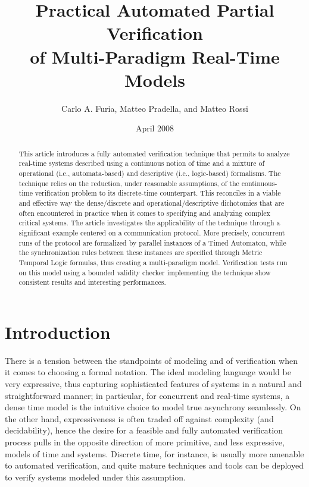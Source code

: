 \documentclass[a4paper]{article}
\title{Practical Automated Partial Verification \\ of Multi-Paradigm Real-Time Models}
\author{Carlo A. Furia, Matteo Pradella, and Matteo Rossi}
\date{April 2008}
\theoremstyle{plain}
\theoremstyle{definition}
\begin{document}
\maketitle

\vspace{3cm}
\begin{abstract}
This article introduces a fully automated verification technique that permits to analyze real-time systems described using a continuous notion of time and a mixture of operational (i.e., automata-based) and descriptive (i.e., logic-based) formalisms.
The technique relies on the reduction, under reasonable assumptions, of the continuous-time verification problem to its discrete-time counterpart.
This reconciles in a viable and effective way the dense/discrete and operational/descriptive di\-chot\-o\-mies that are often encountered in practice when it comes to specifying and analyzing complex critical systems.
The article investigates the applicability of the technique through a significant example centered on a communication protocol. More precisely, concurrent runs of the protocol are formalized by parallel instances of a Timed Automaton, while the synchronization rules between these instances are specified through Metric Temporal Logic formulas, thus creating a multi-paradigm model.
Verification tests run on this model using a bounded validity checker implementing the technique show consistent results and interesting performances.
\end{abstract}

\newpage

\tableofcontents

\newpage



\section{Introduction}
There is a tension between the standpoints of modeling and of verification when it comes to choosing a formal notation.
The ideal modeling language would be very expressive, thus capturing sophisticated features of systems in a natural and straightforward manner; in particular, for concurrent and real-time systems, a dense time model is the intuitive choice to model true asynchrony seamlessly.
On the other hand, expressiveness is often traded off against complexity (and decidability), hence the desire for a feasible and fully automated verification process pulls in the opposite direction of more primitive, and less expressive, models of time and systems.
Discrete time, for instance, is usually more amenable to automated verification, and quite mature techniques and tools can be deployed to verify systems modeled under this assumption.
\end{document}
